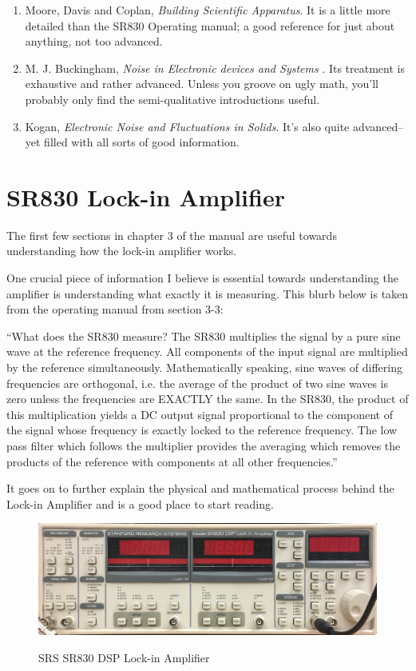 \documentclass{../lab}
\begin{document}
\begin{enumerate}
    \item Moore, Davis and Coplan, \emph{Building Scientific Apparatus}. It is a little more detailed than the SR830 Operating manual; a good reference for just about anything, not too advanced.

    \item M. J. Buckingham, \emph{Noise in Electronic devices and Systems} . Its treatment is exhaustive and rather advanced. Unless you groove on ugly math, you'll probably only find the semi-qualitative introductions useful.

    \item Kogan, \emph{Electronic Noise and Fluctuations in Solids}. It's also quite advanced--yet filled with all sorts of good information.

\end{enumerate}

\section{SR830 Lock-in Amplifier}

The first few sections in chapter 3 of the manual are useful towards understanding how the lock-in amplifier works.

One crucial piece of information I believe is essential towards understanding the amplifier is understanding what exactly it is measuring. This blurb below is taken from the operating manual from section 3-3:

``What does the SR830 measure? The SR830 multiplies the signal by a pure sine wave at the reference frequency. All components of the input signal are multiplied by the reference simultaneously. Mathematically speaking, sine waves of differing frequencies are orthogonal, i.e. the average of the product of two sine waves is zero unless the frequencies are EXACTLY the same. In the SR830, the product of this multiplication yields a DC output signal proportional to the component of the signal whose frequency is exactly locked to the reference frequency. The low pass filter which follows the multiplier provides the averaging which removes the products of the reference with components at all other frequencies.''

It goes on to further explain the physical and mathematical process behind the Lock-in Amplifier and is a good place to start reading.

\begin{figure}[h]
    \centering
    \href{http://experimentationlab.berkeley.edu/sites/default/files/images/LLSimage_SR830.jpg}{\includegraphics[width=0.8\linewidth,keepaspectratio]{images/LLSimage_SR830.jpg}}
    \caption{SRS SR830 DSP Lock-in Amplifier}
    \label{fig:LLSimage_SR830.jpg}
\end{figure}
\end{document}
